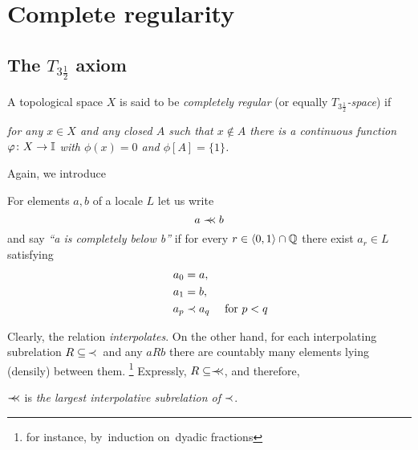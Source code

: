 \chapter{Complete regularity}

\section{The $T_{3\frac{1}{2}}$ axiom}

\begin{framed}
  \begin{df}[$T_{3\frac{1}{2}}$]
    A topological space $X$ is said to be \emph{completely regular\/} (or
    equally \emph{$T_{3\frac{1}{2}}$-space\/}) if
    \begin{center} \it
      for any $x\in X$ and any closed $A$ such that $x\not\in A$ there is a
      continuous function $\varphi\colon X \to \mathbb{I}$ with $\phi(x) = 0$ and $\phi[A]
      = \{1\}$.
    \end{center}
  \end{df}
\end{framed}

Again, we introduce

\begin{framed}
  \begin{nota}[$\cb$]
    For elements $a, b$ of a locale $L$ let us write
    \[
      a \prec\mkern-8mu\prec b
    \]
    and say \emph{``a is completely below b''\/} if for every $r\in \langle 0,
    1 \rangle \cap \mathbb{Q}$ there exist $a_r\in L$ satisfying
    \begin{align*}
      a_0 &= a, \\
      a_1 &= b, \\
      \qquad a_p &\prec a_q \quad \text{ for } p < q
    \end{align*}
  \end{nota}
\end{framed}

\begin{rem} \label{cb-largest-interpolative}
  Clearly, the relation \emph{interpolates\/}.
  On the other hand, for each interpolating subrelation $R\subseteq \, \prec \, $
  and any $a R b$ there are countably many elements lying (densily) between
  them.\thinspace%
  \footnote{for instance, by~induction on~dyadic fractions}
  Expressly, $R\subseteq \prec\mkern-8mu\prec$, and therefore,
  \begin{center}
    $\cb$ is \emph{the largest interpolative subrelation of $\prec$\/}.
  \end{center}
\end{rem}

